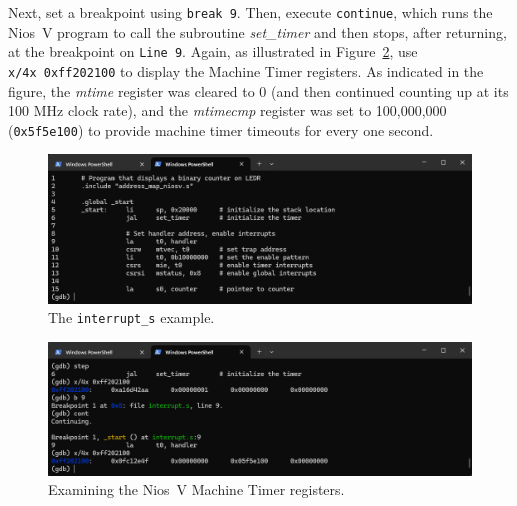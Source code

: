 \documentclass[11pt, twoside, pdftex]{article}
\begin{document}
Next, set a breakpoint using \texttt{break 9}. Then, execute \texttt{continue}, which runs the
Nios~V program to call the subroutine {\it set\_timer} and then stops, after returning, at 
the breakpoint on \texttt{Line 9}. Again, as illustrated in Figure~\ref{fig:interrupt_s2}, use 
\texttt{x/4x~0xff202100} to display the Machine Timer registers. As indicated in the figure, 
the {\it mtime} register was cleared to 0 (and then continued counting up at its 100 MHz clock 
rate), and the {\it mtimecmp} register was set to 100,000,000 (\texttt{0x5f5e100}) to
provide machine timer timeouts for every one second.  

\begin{figure}[h]
    \begin{center}
        \includegraphics[scale=.6]{figures/interrupt_s1.png}
        \caption{The \texttt{interrupt\_s} example.}
        \label{fig:interrupt_s1}
    \end{center}
\end{figure}

\begin{figure}[h]
    \begin{center}
        \includegraphics[scale=.6]{figures/interrupt_s2.png}
        \caption{Examining the Nios~V Machine Timer registers.}
        \label{fig:interrupt_s2}
    \end{center}
\end{figure}
\end{document}
